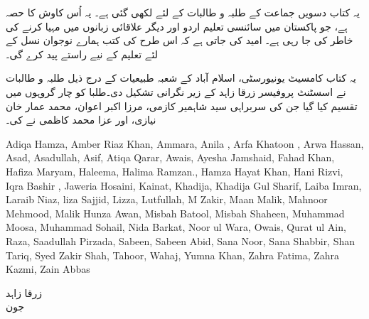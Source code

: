 یہ کتاب دسویں جماعت کے طلبہ و طالبات  کے لئے  لکھی گئی ہے۔ یہ اُس کاوش کا حصہ ہے،  جو پاکستان میں سائنسی تعلیم  اردو اور دیگر علاقائی زبانوں میں مہیا کرنے کی خاطر کی جا رہی ہے۔ امید کی جاتی ہے کہ اس طرح کی کتب ہمارے نوجوان نسل کے لئے  تعلیم کے نیے راستے پید کرے  گی۔ 

یہ کتاب  کامسیٹ یونیورسٹی، اسلام آباد کے شعبہ طبیعیات  کے  درج ذیل طلبہ و طالبات نے  اسسٹنٹ پروفیسر زرقا  زاہد  کے زیر نگرانی     تشکیل دی۔طلبا  کو چار گروہوں میں تقسیم کیا گیا جن کی سربراہی    سید شاہمیر کازمی، مرزا اکبر اعوان، محمد عمار خان نیازی، اور عزا محمد کاظمی نے کی۔

Adiqa Hamza, Amber Riaz Khan, Ammara, Anila , Arfa Khatoon , Arwa Hassan, Asad, Asadullah, Asif, Atiqa Qarar, Awais, Ayesha Jamshaid, Fahad Khan, Hafiza Maryam, Haleema, Halima Ramzan., Hamza Hayat Khan, Hani Rizvi, Iqra Bashir , Jaweria Hosaini, Kainat, Khadija, Khadija Gul Sharif, Laiba Imran, Laraib Niaz, liza Sajjid, Lizza, Lutfullah, M Zakir, Maan Malik, Mahnoor Mehmood, Malik Hunza Awan, Misbah Batool, Misbah Shaheen, Muhammad Moosa, Muhammad Sohail, Nida Barkat, Noor ul Wara, Owais, Qurat ul Ain, Raza, Saadullah Pirzada, Sabeen, Sabeen Abid, Sana Noor, Sana Shabbir, Shan Tariq, Syed Zakir Shah, Tahoor, Wahaj, Yumna Khan, Zahra Fatima, Zahra Kazmi, Zain Abbas


زرقا زاہد\\
  جون 

